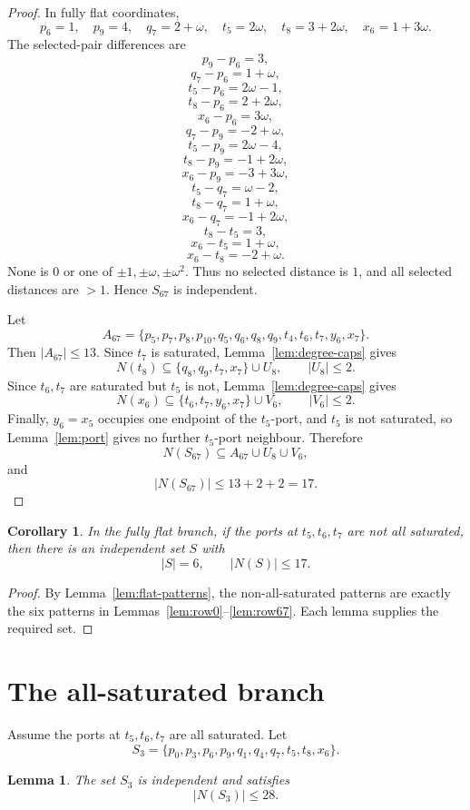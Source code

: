 \documentclass[11pt]{article}
\newtheorem{lemma}[theorem]{Lemma}
\newtheorem{corollary}[theorem]{Corollary}
\begin{document}
\begin{proof}
In fully flat coordinates,
\[
 p_6=1,
 \quad p_9=4,
 \quad q_7=2+\omega,
 \quad t_5=2\omega,
 \quad t_8=3+2\omega,
 \quad x_6=1+3\omega.
\]
The selected-pair differences are
\[
 p_9-p_6=3,
\]
\[
 q_7-p_6=1+\omega,
\]
\[
 t_5-p_6=2\omega-1,
\]
\[
 t_8-p_6=2+2\omega,
\]
\[
 x_6-p_6=3\omega,
\]
\[
 q_7-p_9=-2+\omega,
\]
\[
 t_5-p_9=2\omega-4,
\]
\[
 t_8-p_9=-1+2\omega,
\]
\[
 x_6-p_9=-3+3\omega,
\]
\[
 t_5-q_7=\omega-2,
\]
\[
 t_8-q_7=1+\omega,
\]
\[
 x_6-q_7=-1+2\omega,
\]
\[
 t_8-t_5=3,
\]
\[
 x_6-t_5=1+\omega,
\]
\[
 x_6-t_8=-2+\omega.
\]
None is $0$ or one of $\pm1,\pm\omega,\pm\omega^2$. Thus no selected distance is $1$, and all selected distances are $>1$. Hence $S_{67}$ is independent.

Let
\[
 A_{67}=\{p_5,p_7,p_8,p_{10},q_5,q_6,q_8,q_9,t_4,t_6,t_7,y_6,x_7\}.
\]
Then $|A_{67}|\le13$. Since $t_7$ is saturated, Lemma~\ref{lem:degree-caps} gives
\[
 N(t_8)\subseteq\{q_8,q_9,t_7,x_7\}\cup U_8,
 \qquad |U_8|\le2.
\]
Since $t_6,t_7$ are saturated but $t_5$ is not, Lemma~\ref{lem:degree-caps} gives
\[
 N(x_6)\subseteq\{t_6,t_7,y_6,x_7\}\cup V_6,
 \qquad |V_6|\le2.
\]
Finally, $y_6=x_5$ occupies one endpoint of the $t_5$-port, and $t_5$ is not saturated, so Lemma~\ref{lem:port} gives no further $t_5$-port neighbour. Therefore
\[
 N(S_{67})\subseteq A_{67}\cup U_8\cup V_6,
\]
and
\[
 |N(S_{67})|\le13+2+2=17.
\]
\end{proof}

\begin{corollary}\label{cor:flat-nonall}
In the fully flat branch, if the ports at $t_5,t_6,t_7$ are not all saturated, then there is an independent set $S$ with
\[
 |S|=6,
 \qquad
 |N(S)|\le17.
\]
\end{corollary}

\begin{proof}
By Lemma~\ref{lem:flat-patterns}, the non-all-saturated patterns are exactly the six patterns in Lemmas~\ref{lem:row0}--\ref{lem:row67}. Each lemma supplies the required set.
\end{proof}

\section{The all-saturated branch}

Assume the ports at $t_5,t_6,t_7$ are all saturated. Let
\[
 S_3=\{p_0,p_3,p_6,p_9,q_1,q_4,q_7,t_5,t_8,x_6\}.
\]

\begin{lemma}\label{lem:S3}
The set $S_3$ is independent and satisfies
\[
 |N(S_3)|\le28.
\]
\end{lemma}
\end{document}
